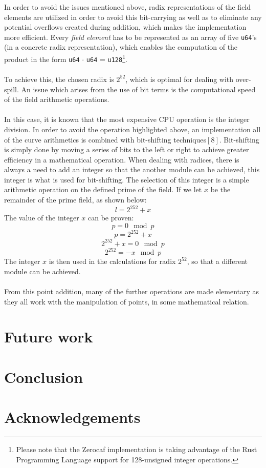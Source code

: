 \documentclass{article}
\begin{document}
In order to avoid the issues mentioned above, radix representations of the field elements are utilized in order to avoid this bit-carrying as well as to eliminate any potential overflows created during addition, which makes the implementation more efficient. Every \textit{field element} has to be represented as an array of five \texttt{u64}'s (in a concrete radix representation), which enables the computation of the product in the form \texttt{u64} $\cdot$ \texttt{u64} = \texttt{u128}\footnote{Please note that the Zerocaf implementation is taking advantage of the Rust Programming Language support for 128-unsigned integer operations.}.
\\\\
To achieve this, the chosen radix is $2^{52}$, which is optimal for dealing with over-spill. An issue which arises from the use of bit terms is the computational speed of the field arithmetic operations. \\\\
In this case, it is known that the most expensive CPU operation is the integer division. In order to avoid the operation highlighted above, an implementation all of the curve arithmetics is combined with bit-shifting techniques$[8]$. Bit-shifting is simply done by moving a series of bits to the left or right to achieve greater efficiency in a mathematical operation. When dealing with radices, there is always a need to add an integer so that the another module can be achieved, this integer is what is used for bit-shifting. The selection of this integer is a simple arithmetic operation on the defined prime of the field. 
If we let $x$ be the remainder of the prime field, as shown below:
$$ l = 2^{252}+x $$
The value of the integer $x$ can be proven:
$$ p = 0\mod p$$  
$$ p = 2^{252}+x $$
$$ 2^{252}+x = 0\mod p $$
$$ 2^{252} = -x\mod p $$
The integer $x$ is then used in the calculations for radix $2^{52}$, so that a different module can be achieved. \\\\
From this point addition, many of the further operations are made elementary as they all work with the manipulation of points, in some mathematical relation.  
\section{Future work}
\section{Conclusion}
\section{Acknowledgements}
\end{document}

